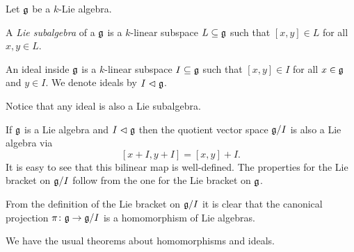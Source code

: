 \begin{defi}
 Let $\mathfrak{g}$ be a $k$-Lie algebra.

 A \emph{Lie subalgebra} of a $\mathfrak{g}$ is a $k$-linear subspace $L \subseteq \mathfrak{g}$ such that $[x,y] \in L$ for all $x,y \in L$.
 
 An ideal inside $\mathfrak{g}$ is a $k$-linear subspace $I \subseteq \mathfrak{g}$ such that $[x,y] \in I$ for all $x \in \mathfrak{g}$ and $y \in I$. We denote ideals by $I \vartriangleleft \mathfrak{g}$.
\end{defi}


Notice that any ideal is also a Lie subalgebra.


\begin{rem}
 If $\mathfrak{g}$ is a Lie algebra and $I \vartriangleleft \mathfrak{g}$ then the quotient vector space $\mathfrak{g}/I$ is also a Lie algebra via
 \[
  [x+I, y+I] = [x,y] + I.
 \]
 It is easy to see that this bilinear map is well-defined. The properties for the Lie bracket on $\mathfrak{g}/I$ follow from the one for the Lie bracket on $\mathfrak{g}$.
 
 From the definition of the Lie bracket on $\mathfrak{g}/I$ it is clear that the canonical projection $\pi \colon \mathfrak{g} \to \mathfrak{g}/I$ is a homomorphism of Lie algebras.
\end{rem}


We have the usual theorems about homomorphisms and ideals.


